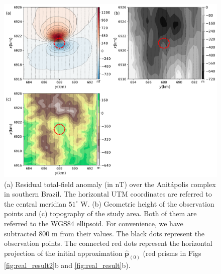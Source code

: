 \begin{figure}
    \centering
    \includegraphics[width=\linewidth]{figures/field_data_alt_topo.png}
    \caption{(a) Residual total-field anomaly (in nT) over the  
    Anit{\'a}polis complex in southern Brazil. The horizontal UTM 
    coordinates are referred to the central meridian $ 51^\circ $ W. (b) Geometric 
    height of the observation points and (c) topography of the study area.
    Both of them are referred to the WGS84 ellipsoid. For convenience, we have 
    subtracted $ 800 $ m from their values. 
    The black dots represent the observation points. 
    The connected red dots represent the horizontal projection of the 
    initial approximation $\hat{\mathbf{p}}_{(0)}$ 
    (red prisms in Figs \ref{fig:real_result2}b and \ref{fig:real_result}b).}
    \label{fig:real_data}
\end{figure}


